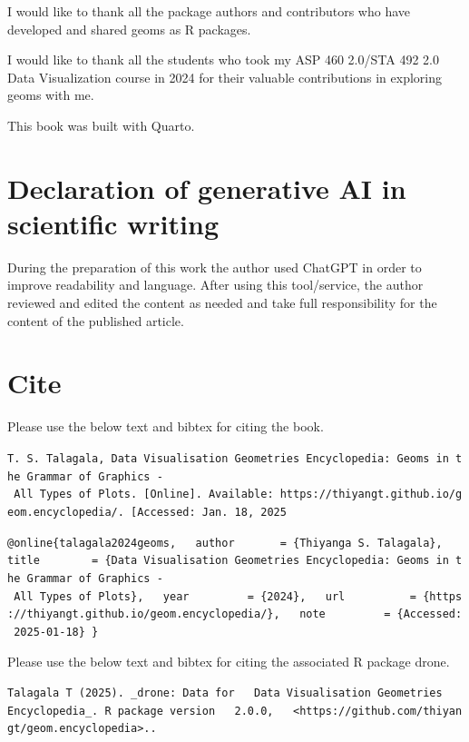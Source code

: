 \documentclass[
  letterpaper,
  DIV=11,
  numbers=noendperiod]{scrreprt}
\begin{document}
I would like to thank all the package authors and contributors who have
developed and shared geoms as R packages.

I would like to thank all the students who took my ASP 460 2.0/STA 492
2.0 Data Visualization course in 2024 for their valuable contributions
in exploring geoms with me.

This book was built with Quarto.

\section*{Declaration of generative AI in scientific
writing}\label{declaration-of-generative-ai-in-scientific-writing}


During the preparation of this work the author used ChatGPT in order to
improve readability and language. After using this tool/service, the
author reviewed and edited the content as needed and take full
responsibility for the content of the published article.

\section*{Cite}\label{cite}


Please use the below text and bibtex for citing the book.

\texttt{T.\ S.\ Talagala,\ Data\ Visualisation\ Geometries\ Encyclopedia:\ Geoms\ in\ the\ Grammar\ of\ Graphics\ -\ All\ Types\ of\ Plots.\ {[}Online{]}.\ Available:\ https://thiyangt.github.io/geom.encyclopedia/.\ {[}Accessed:\ Jan.\ 18,\ 2025}

\texttt{@online\{talagala2024geoms,\ \ \ author\ \ \ \ \ \ \ =\ \{Thiyanga\ S.\ Talagala\},\ \ \ title\ \ \ \ \ \ \ \ =\ \{Data\ Visualisation\ Geometries\ Encyclopedia:\ Geoms\ in\ the\ Grammar\ of\ Graphics\ -\ All\ Types\ of\ Plots\},\ \ \ year\ \ \ \ \ \ \ \ \ =\ \{2024\},\ \ \ url\ \ \ \ \ \ \ \ \ \ =\ \{https://thiyangt.github.io/geom.encyclopedia/\},\ \ \ note\ \ \ \ \ \ \ \ \ =\ \{Accessed:\ 2025-01-18\}\ \}}

Please use the below text and bibtex for citing the associated R package
drone.

\texttt{Talagala\ T\ (2025).\ \_drone:\ Data\ for\ \ \ Data\ Visualisation\ Geometries\ \ \ Encyclopedia\_.\ R\ package\ version\ \ \ 2.0.0,\ \ \ \textless{}https://github.com/thiyangt/geom.encyclopedia\textgreater{}..}
\end{document}
